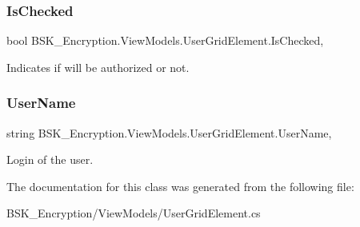 \subsubsection{\texorpdfstring{Is\+Checked}{IsChecked}}
{\footnotesize\ttfamily bool B\+S\+K\+\_\+\+Encryption.\+View\+Models.\+User\+Grid\+Element.\+Is\+Checked\hspace{0.3cm}{\ttfamily [get]}, {\ttfamily [set]}}



Indicates if will be authorized or not. 

\mbox{\label{class_b_s_k___encryption_1_1_view_models_1_1_user_grid_element_a51f91f62aeffe54cd095deb969370f56}} 
\subsubsection{\texorpdfstring{User\+Name}{UserName}}
{\footnotesize\ttfamily string B\+S\+K\+\_\+\+Encryption.\+View\+Models.\+User\+Grid\+Element.\+User\+Name\hspace{0.3cm}{\ttfamily [get]}, {\ttfamily [set]}}



Login of the user. 



The documentation for this class was generated from the following file\+:\begin{DoxyCompactItemize}
\item 
B\+S\+K\+\_\+\+Encryption/\+View\+Models/User\+Grid\+Element.\+cs\end{DoxyCompactItemize}
